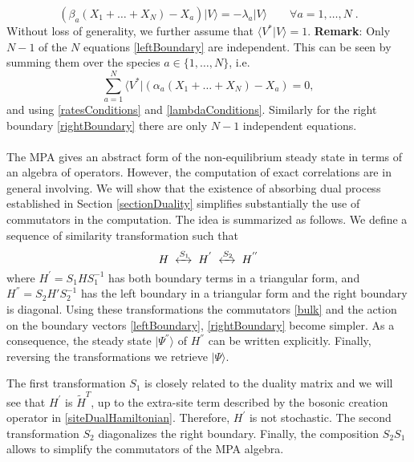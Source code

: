 \documentclass[10pt]{article}
\numberwithin{equation}{section}
\numberwithin{equation}{subsection}
\newcommand{\dt}{\;.}
\begin{document}
\begin{equation}\label{rightBoundary}
	\left(\beta_{a}(X_{1}+\ldots+X_{N})-X_{a}\right)|V\rangle=-\lambda_{a}|V\rangle\qquad\forall a=1,\ldots,N\dt
\end{equation}
Without loss of generality, we further assume that $\langle V^{*}|V\rangle=1$. 
\newline \newline
\textbf{Remark}: Only $N-1$ of the $N$ equations \eqref{leftBoundary}  are independent. This can be seen by summing them over the species $a\in \{1,\ldots,N\}$, i.e.
	\begin{equation}
		\sum_{a=1}^{N}	\langle V^{*}|\left(\alpha_{a}(X_{1}+\ldots+X_{N})-X_{a}\right)=0,%
	\end{equation}
	and using  \eqref{ratesConditions} and \eqref{lambdaConditions}.
 Similarly for the right boundary  \eqref{rightBoundary} there are only  $N-1$ independent equations. \\ \\The MPA gives an abstract form of the non-equilibrium steady state in terms of an algebra of operators. However, the computation of exact correlations are in general involving. 
 We will show that the existence of absorbing dual process established in Section \ref{sectionDuality} simplifies substantially the use of commutators in the
 computation. The idea is summarized as follows. We define a sequence of similarity transformation such that 
 \begin{equation}
 	H\;\xleftrightarrow{S_{1}}\;H^{'}\;\xleftrightarrow{S_{2}}\;H^{''}
 \end{equation} 
 where $H^{'}= S_{1} H S_{1}^{-1} $ has both boundary terms in a triangular form, and $H^{''} = S_{2}H' S_{2}^{-1}$ has the left boundary in a triangular form and the right boundary is diagonal. Using these transformations the commutators \eqref{bulk} and the action on the boundary vectors \eqref{leftBoundary}, \eqref{rightBoundary} become simpler. As a consequence, the steady state $|\Psi^{''}\rangle$ of $H^{''}$ can be written explicitly. Finally, reversing the transformations we retrieve $|\Psi\rangle$.
 
 The first transformation $S_{1}$ is closely related to the duality matrix and we will see that $H^{'}$ is $\widetilde{H}^{T}$, up to the extra-site term described by the bosonic creation operator in \eqref{siteDualHamiltonian}. Therefore, $H^{'}$ is not stochastic. The second transformation $S_{2}$ diagonalizes the right boundary. Finally, the composition  $S_{2} S_{1}$ allows to simplify the commutators of the MPA algebra. \\
\end{document}
